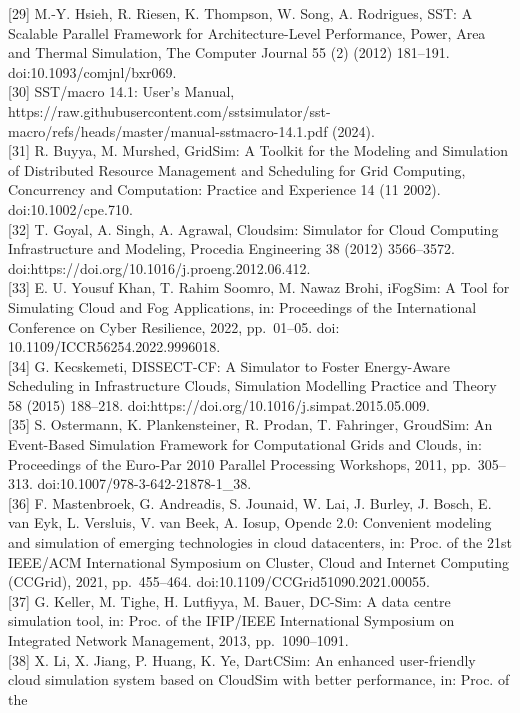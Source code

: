 \documentclass[
]{article}
\begin{document}
{[}29{]} M.-Y. Hsieh, R. Riesen, K. Thompson, W. Song, A. Rodrigues,
SST: A Scalable Parallel Framework for Architecture-Level Performance,
Power, Area and Thermal Simulation, The Computer Journal 55 (2) (2012)
181--191. doi:10.1093/comjnl/bxr069.\\
{[}30{]} SST/macro 14.1: User's Manual,
https://raw.githubusercontent.com/sstsimulator/sst-macro/refs/heads/master/manual-sstmacro-14.1.pdf
(2024).\\
{[}31{]} R. Buyya, M. Murshed, GridSim: A Toolkit for the Modeling and
Simulation of Distributed Resource Management and Scheduling for Grid
Computing, Concurrency and Computation: Practice and Experience 14 (11
2002). doi:10.1002/cpe.710.\\
{[}32{]} T. Goyal, A. Singh, A. Agrawal, Cloudsim: Simulator for Cloud
Computing Infrastructure and Modeling, Procedia Engineering 38 (2012)
3566--3572. doi:https://doi.org/10.1016/j.proeng.2012.06.412.\\
{[}33{]} E. U. Yousuf Khan, T. Rahim Soomro, M. Nawaz Brohi, iFogSim: A
Tool for Simulating Cloud and Fog Applications, in: Proceedings of the
International Conference on Cyber Resilience, 2022, pp.~01--05. doi:
10.1109/ICCR56254.2022.9996018.\\
{[}34{]} G. Kecskemeti, DISSECT-CF: A Simulator to Foster Energy-Aware
Scheduling in Infrastructure Clouds, Simulation Modelling Practice and
Theory 58 (2015) 188--218.
doi:https://doi.org/10.1016/j.simpat.2015.05.009.\\
{[}35{]} S. Ostermann, K. Plankensteiner, R. Prodan, T. Fahringer,
GroudSim: An Event-Based Simulation Framework for Computational Grids
and Clouds, in: Proceedings of the Euro-Par 2010 Parallel Processing
Workshops, 2011, pp.~305--313. doi:10.1007/978-3-642-21878-1\_38.\\
{[}36{]} F. Mastenbroek, G. Andreadis, S. Jounaid, W. Lai, J. Burley, J.
Bosch, E. van Eyk, L. Versluis, V. van Beek, A. Iosup, Opendc 2.0:
Convenient modeling and simulation of emerging technologies in cloud
datacenters, in: Proc. of the 21st IEEE/ACM International Symposium on
Cluster, Cloud and Internet Computing (CCGrid), 2021, pp.~455--464.
doi:10.1109/CCGrid51090.2021.00055.\\
{[}37{]} G. Keller, M. Tighe, H. Lutfiyya, M. Bauer, DC-Sim: A data
centre simulation tool, in: Proc. of the IFIP/IEEE International
Symposium on Integrated Network Management, 2013, pp.~1090--1091.\\
{[}38{]} X. Li, X. Jiang, P. Huang, K. Ye, DartCSim: An enhanced
user-friendly cloud simulation system based on CloudSim with better
performance, in: Proc. of the
\end{document}
